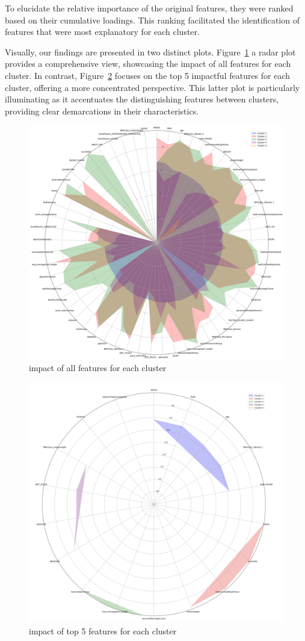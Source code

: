 \documentclass[12pt]{article}
\begin{document}
To elucidate the relative importance of the original features, they were ranked based on their cumulative loadings. This ranking facilitated the identification of features that were most explanatory for each cluster.

Visually, our findings are presented in two distinct plots. 
Figure~\ref{fig:all_features} a radar plot provides a comprehensive view, showcasing the impact of all features for each cluster. 
In contrast, Figure~\ref{fig:top5_features} focuses on the top 5 impactful features for each cluster, offering a more concentrated perspective. This latter plot is particularly illuminating as it accentuates the distinguishing features between clusters, providing clear demarcations in their characteristics.

\begin{figure}[h]
  \centering
  \includegraphics[width=0.7\linewidth]{images/all_feature}
  \caption{impact of all features for each cluster}
  \label{fig:all_features}
  \end{figure}

  \begin{figure}[h]
    \centering
    \includegraphics[width=0.7\linewidth]{images/top5_features.png}
    \caption{impact of top 5 features for each cluster}
    \label{fig:top5_features}
    \end{figure}
\end{document}
